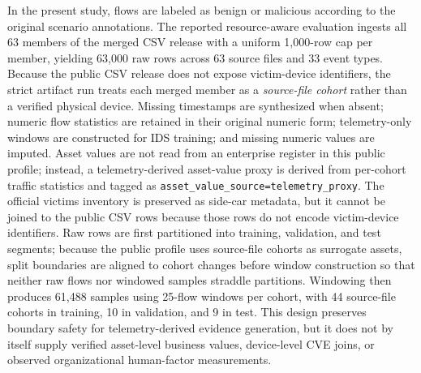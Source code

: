 \documentclass[preprint,12pt]{elsarticle}
\begin{document}
In the present study, flows are labeled as benign or malicious according to the original scenario annotations. The reported resource-aware evaluation ingests all 63 members of the merged CSV release with a uniform 1{,}000-row cap per member, yielding 63{,}000 raw rows across 63 source files and 33 event types. Because the public CSV release does not expose victim-device identifiers, the strict artifact run treats each merged member as a \emph{source-file cohort} rather than a verified physical device. Missing timestamps are synthesized when absent; numeric flow statistics are retained in their original numeric form; telemetry-only windows are constructed for IDS training; and missing numeric values are imputed. Asset values are not read from an enterprise register in this public profile; instead, a telemetry-derived asset-value proxy is derived from per-cohort traffic statistics and tagged as \texttt{asset\_value\_source=telemetry\_proxy}. The official victims inventory is preserved as side-car metadata, but it cannot be joined to the public CSV rows because those rows do not encode victim-device identifiers. Raw rows are first partitioned into training, validation, and test segments; because the public profile uses source-file cohorts as surrogate assets, split boundaries are aligned to cohort changes before window construction so that neither raw flows nor windowed samples straddle partitions. Windowing then produces 61{,}488 samples using 25-flow windows per cohort, with 44 source-file cohorts in training, 10 in validation, and 9 in test. This design preserves boundary safety for telemetry-derived evidence generation, but it does not by itself supply verified asset-level business values, device-level CVE joins, or observed organizational human-factor measurements.
\end{document}

